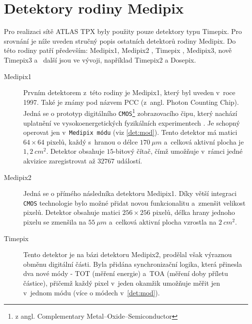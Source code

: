 \newpage
\section{Detektory rodiny Medipix}\label{det:med}
Pro realizaci sítě ATLAS TPX byly použity pouze detektory typu Timepix. Pro srovnání je níže uveden stručný popis ostatních detektorů rodiny Medipix.
Do této rodiny patří především: Medipix1, Medipix2 \cite{Llopart-medipix2}, Timepix \cite{timepix}, Medipix3, nově Timepix3 \cite{timepix3} a~ další jsou ve vývoji, například Timepix2 a Dosepix. 

\begin{description}
	\item[Medipix1] Prvním detektorem z~této rodiny je Medipix1, který byl uveden v~roce 1997. Také je známy pod názvem PCC (z~angl. Photon Counting Chip). Jedná se o prototyp digitálního \texttt{CMOS}\footnote{z angl. Complementary Metal–Oxide–Semiconductor} zobrazovacího čipu, který nachází uplatnění ve vysokoenergetických fyzikálních experimentech \cite{medipix-www}. Je schopný operovat jen v~\texttt{Medipix módu} (viz \ref{det:mod}). Tento detektor má matici $64\times64$ pixelů, každý s~hranou o délce $170~\mu m$ a~celková aktivní plocha je $1,2~cm^2$. Detektor obsahuje $15$-bitový čítač, čímž umožňuje v~rámci jedné akvizice zaregistrovat až $32767$ událostí.

	\item[Medipix2] Jedná se o přímého následníka detektoru Medipix1. 
	Díky větší integraci \texttt{CMOS} technologie bylo možné přidat novou funkcionalitu a~zmenšit velikost pixelů.
	Detektor obsahuje matici $256\times256$ pixelů, délka hrany jednoho pixelu se zmenšila na $55~\mu m$ a~celková aktivní plocha vzrostla na $2~cm^2$.

	\item[Timepix]\label{det:tim} Tento detektor je na bázi detektoru Medipix2, prodělal však výraznou obměnu digitální části. Byla přidána synchronizační logika, která přinesla dva nové módy - TOT (měření energie) a~TOA (měření doby příletu částice), přičemž každý pixel v~jeden okamžik umožňuje měřit jen v~jednom módu
	(více o módech v~\ref{det:mod}). 


\end{description}
